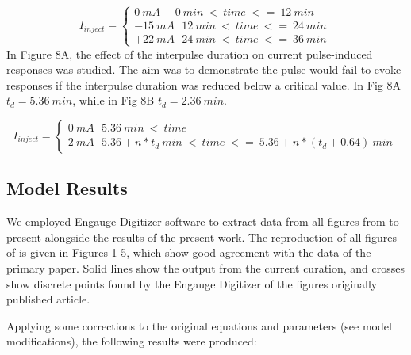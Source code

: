 \documentclass[fleqn,10pt]{physiome}
\begin{document}
\begin{equation}
  I_{inject} =
  \begin{cases}
  0\ mA  \  \ \  \ \ \  0\ min\ < \ time \ <= \ 12\ min\  \\
 -15 \ mA  \  \ \   12\ min\ < \ time \ <= \ 24\ min\ \\
 +22 \ mA  \  \ \   24\ min\ < \ time \ <= \ 36\ min 
 \label{eq:simu3}

  \end{cases}
\end{equation}
In Figure 8A, the effect of the interpulse duration on current pulse-induced responses was studied. The aim was to demonstrate the pulse would fail to evoke responses if the interpulse duration was reduced below a critical value. In Fig 8A $t_{d} = 5.36 \ min$, while in Fig 8B $t_{d} = 2.36 \ min$.


\begin{equation}
  I_{inject} =
  \begin{cases}
  0\ mA  \  \ \   5.36\ min\ < \ time   \\
  2 \ mA  \  \ \   5.36 + n*t_{d}\ min\ < \ time \ <= \ 5.36 + n*(t_{d}+0.64)\ min\ 
 \label{eq:simu8} 

  \end{cases}
\end{equation}

\subsection{Model Results}
We employed Engauge Digitizer software \citep{mark_mitchell_2020_3941227} to extract data from all figures from  \citet{imtiaz2002theoretical} to present alongside the results of the present work. The reproduction of all figures of \citet{imtiaz2002theoretical} is given in Figures 1-5, which show good agreement with the data of the primary paper. Solid lines show the output from the current curation, and crosses show discrete points found by the Engauge Digitizer of the figures originally published article.

Applying some corrections to the original equations and parameters (see model modifications), the following results were produced:
\end{document}
